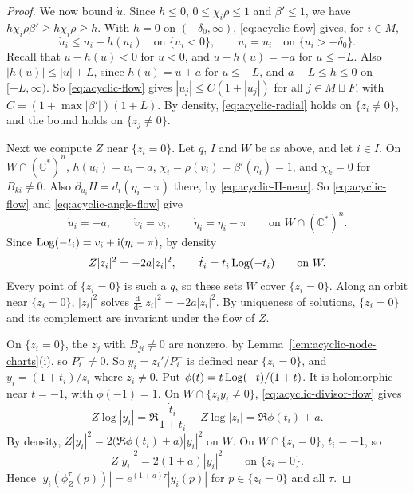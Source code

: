 \documentclass[11pt,a4paper]{article}
\newcommand{\bC}{\mathbb C}\newcommand{\bR}{\mathbb R}\newcommand{\bZ}{\mathbb Z}
\newcommand{\dd}{\mathrm d}\newcommand{\T}{\mathsf T}
\begin{document}
\begin{proof}
We now bound $\dot u$.
Since $h\le0$, $0\le\chi_i\rho\le1$ and $\beta'\le1$, we have $h\chi_i\rho\beta'\ge h\chi_i\rho\ge h$.
With $h=0$ on $(-\delta_0,\infty)$, \eqref{eq:acyclic-flow} gives, for $i\in M$,
\begin{equation}\label{eq:acyclic-radial}
 \dot u_i\le u_i-h(u_i)\quad\text{on }\{u_i<0\},\qquad \dot u_i=u_i\quad\text{on }\{u_i>-\delta_0\}.
\end{equation}
Recall that $u-h(u)<0$ for $u<0$, and $u-h(u)=-a$ for $u\le-L$.
Also $|h(u)|\le|u|+L$, since $h(u)=u+a$ for $u\le-L$, and $a-L\le h\le0$ on $[-L,\infty)$.
So \eqref{eq:acyclic-flow} gives $|\dot u_j|\le C(1+|u_j|)$ for all $j\in M\sqcup F$, with $C=(1+\max|\beta'|)(1+L)$.
By density, \eqref{eq:acyclic-radial} holds on $\{z_i\ne0\}$, and the bound holds on $\{z_j\ne0\}$.

Next we compute $Z$ near $\{z_i=0\}$.
Let $q$, $I$ and $W$ be as above, and let $i\in I$.
On $W\cap(\bC^*)^{n}$, $h(u_i)=u_i+a$, $\chi_i=\rho(v_i)=\beta'(\eta_i)=1$, and $\chi_k=0$ for $B_{ki}\ne0$.
Also $\partial_{u_i}H=d_i(\eta_i-\pi)$ there, by \eqref{eq:acyclic-H-near}.
So \eqref{eq:acyclic-flow} and \eqref{eq:acyclic-angle-flow} give
\[
 \dot u_i=-a,\qquad \dot v_i=v_i,\qquad \dot\eta_i=\eta_i-\pi\qquad\text{on }W\cap(\bC^*)^{n}.
\]
Since $\operatorname{Log}(-t_i)=v_i+\mathrm i(\eta_i-\pi)$, by density
\begin{equation}\label{eq:acyclic-divisor-flow}
 Z|z_i|^2=-2a|z_i|^2,\qquad \dot t_i=t_i\operatorname{Log}(-t_i)\qquad\text{on }W.
\end{equation}
Every point of $\{z_i=0\}$ is such a $q$, so these sets $W$ cover $\{z_i=0\}$.
Along an orbit near $\{z_i=0\}$, $|z_i|^2$ solves $\frac{\dd}{\dd\tau}|z_i|^2=-2a|z_i|^2$.
By uniqueness of solutions, $\{z_i=0\}$ and its complement are invariant under the flow of $Z$.

On $\{z_i=0\}$, the $z_j$ with $B_{ji}\ne0$ are nonzero, by Lemma~\ref{lem:acyclic-node-charts}(i), so $P_i^-\ne0$.
So $y_i=z_i'/P_i^-$ is defined near $\{z_i=0\}$, and $y_i=(1+t_i)/z_i$ where $z_i\ne0$.
Put $\phi(t)=t\operatorname{Log}(-t)/(1+t)$.
It is holomorphic near $t=-1$, with $\phi(-1)=1$.
On $W\cap\{z_iy_i\ne0\}$, \eqref{eq:acyclic-divisor-flow} gives
\[
 Z\log|y_i|=\Re\frac{\dot t_i}{1+t_i}-Z\log|z_i|=\Re\phi(t_i)+a .
\]
By density, $Z|y_i|^2=2\bigl(\Re\phi(t_i)+a\bigr)|y_i|^2$ on $W$.
On $W\cap\{z_i=0\}$, $t_i=-1$, so
\begin{equation}\label{eq:acyclic-partner-flow}
 Z|y_i|^2=2(1+a)|y_i|^2\qquad\text{on }\{z_i=0\}.
\end{equation}
Hence $|y_i(\phi_Z^\tau(p))|=e^{(1+a)\tau}|y_i(p)|$ for $p\in\{z_i=0\}$ and all $\tau$.


\end{proof}
\end{document}
